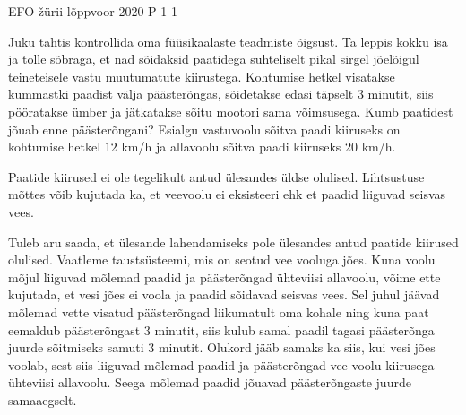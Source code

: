 {EFO žürii} %
{lõppvoor} %
{2020} %
{P 1} %
{1} %
{

\ifStatement
Juku tahtis kontrollida oma füüsikaalaste teadmiste õigsust. Ta leppis kokku isa ja tolle sõbraga, et nad sõidaksid paatidega suhteliselt pikal sirgel jõelõigul teineteisele vastu muutumatute kiirustega. Kohtumise hetkel visatakse kummastki paadist välja päästerõngas, sõidetakse edasi täpselt $3$ minutit, siis pööratakse ümber ja jätkatakse sõitu mootori sama võimsusega. Kumb paatidest jõuab enne päästerõngani? Esialgu vastuvoolu sõitva paadi kiiruseks on kohtumise hetkel $12$ km/h ja allavoolu sõitva paadi kiiruseks $20$ km/h.
\fi

\ifHint
Paatide kiirused ei ole tegelikult antud ülesandes üldse olulised. Lihtsustuse mõttes võib kujutada ka, et veevoolu ei eksisteeri ehk et paadid liiguvad seisvas vees.
\fi

\ifSolution
Tuleb aru saada, et ülesande lahendamiseks pole ülesandes antud paatide kiirused olulised. Vaatleme taustsüsteemi, mis on seotud vee vooluga jões. Kuna voolu mõjul liiguvad mõlemad paadid ja päästerõngad ühteviisi allavoolu, võime ette kujutada, et vesi jões ei voola ja paadid sõidavad seisvas vees. Sel juhul jäävad mõlemad vette visatud päästerõngad liikumatult oma kohale ning kuna paat eemaldub päästerõngast $3$ minutit, siis kulub samal paadil tagasi päästerõnga juurde sõitmiseks samuti $3$ minutit. Olukord jääb samaks ka siis, kui vesi jões voolab, sest siis liiguvad mõlemad paadid ja päästerõngad vee voolu kiirusega ühteviisi allavoolu. Seega mõlemad paadid jõuavad päästerõngaste juurde samaaegselt.
\fi
}
